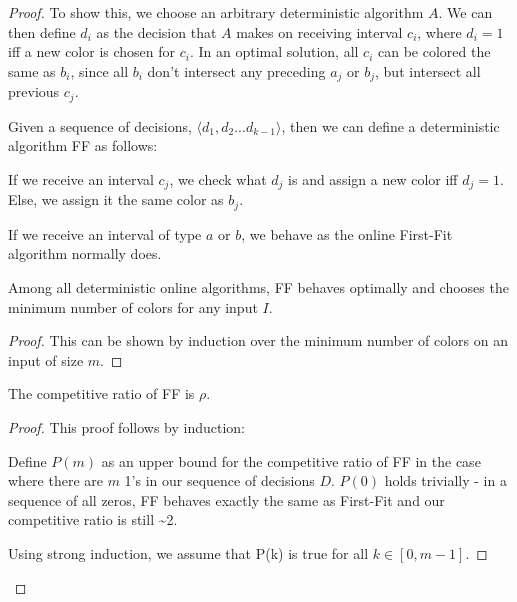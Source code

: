 \begin{proof}
To show this, we choose an arbitrary deterministic algorithm $A$. We can then define $d_i$ as the decision that $A$ makes on receiving interval $c_i$, where $d_i = 1$ iff a new color is chosen for $c_i$.  In an optimal solution, all $c_i$ can be colored the same as $b_i$, since all $b_i$ don't intersect any preceding $a_j$ or $b_j$, but intersect all previous $c_j$.  

Given a sequence of decisions, $\langle d_1, d_2...d_{k-1} \rangle$, then we can define a deterministic algorithm FF as follows:

If we receive an interval $c_j$, we check what $d_j$ is and assign a new color iff $d_j = 1$. Else, we assign it the same color as $b_j$. 

If we receive an interval of type $a$ or $b$, we behave as the online First-Fit algorithm normally does.

\begin{lemma} Among all deterministic online algorithms, FF behaves optimally and chooses the minimum number of colors for any input $I$. \end{lemma}
\begin{proof}
This can be shown by induction over the minimum number of colors on an input of size $m$. 
\end{proof}

\begin{lemma} The competitive ratio of FF is $\rho$. \end{lemma}
\begin{proof}
This proof follows by induction:

Define $P(m)$ as an upper bound for the competitive ratio of FF in the case where there are $m$ 1's in our sequence of decisions $D$.  $P(0)$ holds trivially - in a sequence of all zeros, FF behaves exactly the same as First-Fit and our competitive ratio is still \textasciitilde2.

Using strong induction, we assume that P(k) is true for all $k \in [0,m-1]$.  



\end{proof}
\end{proof}
